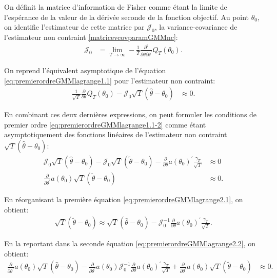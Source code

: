 On définit la matrice d'information de Fisher comme étant la limite de
l'espérance de la valeur de la dérivée seconde de la fonction
objectif. Au point $\theta_0$, on identifie l'estimateur de cette
matrice par $\mathcal{J}_0$, la variance-covariance de l'estimateur
non contraint \eqref{matricevcovparamGMMnc}:
\begin{align}
  \label{eq:fisherJGMMlagrange}
  \mathcal{J}_0 &= \lim_{T\to\infty} -\frac{1}{T}
  \frac{\partial^2}{\partial\theta\partial\theta^{\prime}}Q_T(\theta_0).
\end{align}

On reprend l'équivalent asymptotique de l'équation
\eqref{eq:premierordreGMMlagrange1.1} pour l'estimateur non contraint:
\begin{align}
  \frac{1}{\sqrt{T}} \frac{\partial}{\partial\theta}Q_T(\theta_0) -
  \mathcal{J}_0 \sqrt{T} (\hat\theta - \theta_0) &\approx
  0\label{eq:premierordreGMMnc1.1}.
\end{align}

En combinant ces deux dernières expressions, on peut formuler les
conditions de premier ordre \eqref{eq:premierordreGMMlagrange1.1-2}
comme étant asymptotiquement des fonctions linéaires de l'estimateur
non contraint $\sqrt{T} (\hat\theta - \theta_0)$:
\begin{align}
  \mathcal{J}_0 \sqrt{T} (\hat\theta - \theta_0) - \mathcal{J}_0
  \sqrt{T} (\tilde\theta - \theta_0) -
  \frac{\partial}{\partial\theta}a(\theta_0)^{\prime}\frac{\gamma_{\scriptscriptstyle
      T}}{\sqrt{T}} &\approx 0 \label{eq:premierordreGMMlagrange2.1}\\
  \frac{\partial}{\partial\theta^{\prime}} a(\theta_0) \sqrt{T}
  (\tilde\theta - \theta_0) &\approx
  0. \label{eq:premierordreGMMlagrange2.2}
\end{align}

En réorganisant la première équation
\eqref{eq:premierordreGMMlagrange2.1}, on obtient:
\begin{align}
  \label{eq:premierordreGMMlagrange3.1}
  \sqrt{T} (\tilde\theta - \theta_0) \approx \sqrt{T} (\hat\theta -
  \theta_0) - \mathcal{J}_0^{-1}
  \frac{\partial}{\partial\theta}a(\theta_0)^{\prime}\frac{\gamma_{\scriptscriptstyle
      T}}{\sqrt{T}}.
\end{align}

En la reportant dans la seconde équation
\eqref{eq:premierordreGMMlagrange2.2}, on obtient:
\begin{align}
  \label{eq:premierordreGMMlagrange3.2}
  \frac{\partial}{\partial\theta^{\prime}} a(\theta_0) \sqrt{T}
  (\hat\theta - \theta_0) - \frac{\partial}{\partial\theta^{\prime}}
  a(\theta_0) \mathcal{J}_0^{-1}
  \frac{\partial}{\partial\theta}a(\theta_0)^{\prime}\frac{\gamma_{\scriptscriptstyle
      T}}{\sqrt{T}} + \frac{\partial}{\partial\theta^{\prime}}
  a(\theta_0) \sqrt{T} (\tilde\theta - \theta_0) &\approx 0.
\end{align}

